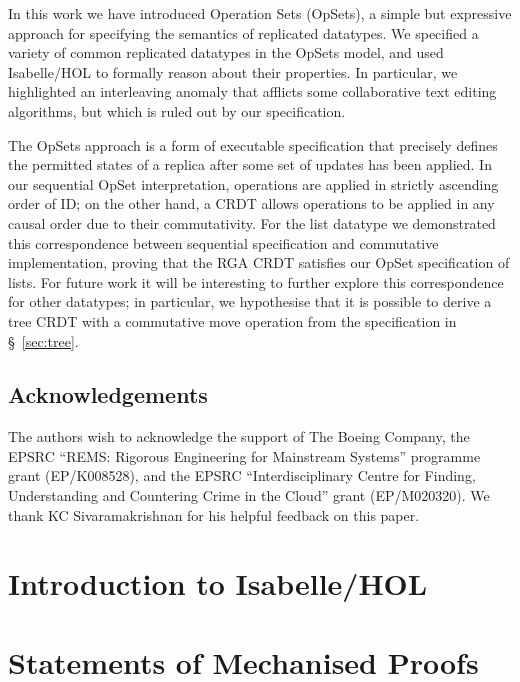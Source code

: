 \documentclass[11pt]{article}
\begin{document}
In this work we have introduced Operation Sets (OpSets), a simple but expressive approach for specifying the semantics of replicated datatypes.
We specified a variety of common replicated datatypes in the OpSets model, and used Isabelle/HOL to formally reason about their properties.
In particular, we highlighted an interleaving anomaly that afflicts some collaborative text editing algorithms, but which is ruled out by our specification.

The OpSets approach is a form of executable specification that precisely defines the permitted states of a replica after some set of updates has been applied.
In our sequential OpSet interpretation, operations are applied in strictly ascending order of ID; on the other hand, a CRDT allows operations to be applied in any causal order due to their commutativity.
For the list datatype we demonstrated this correspondence between sequential specification and commutative implementation, proving that the RGA CRDT satisfies our OpSet specification of lists.
For future work it will be interesting to further explore this correspondence for other datatypes; in particular, we hypothesise that it is possible to derive a tree CRDT with a commutative move operation from the specification in \S~\ref{sec:tree}.


\subsection*{Acknowledgements}

The authors wish to acknowledge the support of The Boeing Company,
the EPSRC ``REMS: Rigorous Engineering for Mainstream Systems'' programme grant (EP/K008528), and
the EPSRC ``Interdisciplinary Centre for Finding, Understanding and Countering Crime in the Cloud'' grant (EP/M020320).
We thank KC Sivaramakrishnan for his helpful feedback on this paper.

\newpage


{}

\newpage

\appendix

\section{Introduction to Isabelle/HOL}

\newpage

\section{Statements of Mechanised Proofs}
\end{document}

